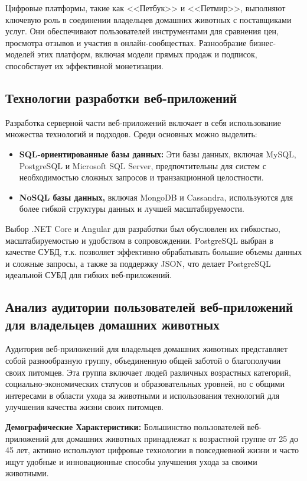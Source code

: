 Цифровые платформы, такие как <<Петбук>> и <<Петмир>>, выполняют ключевую роль в соединении владельцев домашних животных с поставщиками услуг. Они обеспечивают пользователей инструментами для сравнения цен, просмотра отзывов и участия в онлайн-сообществах. Разнообразие бизнес-моделей этих платформ, включая модели прямых продаж и подписок, способствует их эффективной монетизации.

\subsection{Технологии разработки веб-приложений}

Разработка серверной части веб-приложений включает в себя использование множества технологий и подходов. Среди основных можно выделить:

\begin{itemize}
  \item \textbf{SQL-ориентированные базы данных:} Эти базы данных, включая MySQL, PostgreSQL и Microsoft SQL Server, предпочтительны для систем с необходимостью сложных запросов и транзакционной целостности.
  \item \textbf{NoSQL базы данных,} включая MongoDB и Cassandra, используются для более гибкой структуры данных и лучшей масштабируемости.
\end{itemize}

Выбор .NET Core и Angular для разработки был обусловлен их гибкостью, масштабируемостью и удобством в сопровождении.
PostgreSQL выбран в качестве СУБД, т.к. позволяет эффективно обрабатывать большие объемы данных и сложные запросы, а также за поддержку JSON, что делает PostgreSQL идеальной СУБД для гибких веб-приложений.

\subsection{Анализ аудитории пользователей веб-приложений для владельцев домашних животных}

Аудитория веб-приложений для владельцев домашних животных представляет собой разнообразную группу, объединенную общей заботой о благополучии своих питомцев. Эта группа включает людей различных возрастных категорий, социально-экономических статусов и образовательных уровней, но с общими интересами в области ухода за животными и использования технологий для улучшения качества жизни своих питомцев.

\textbf{Демографические Характеристики:}
Большинство пользователей веб-приложений для домашних животных принадлежат к возрастной группе от 25 до 45 лет, активно используют цифровые технологии в повседневной жизни и часто ищут удобные и инновационные способы улучшения ухода за своими животными.

